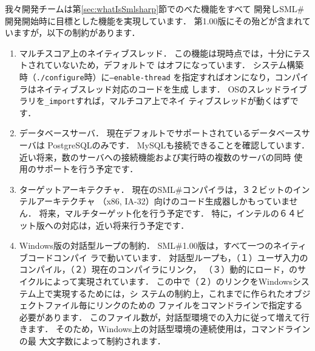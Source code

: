 \documentclass{jbook}
\newcommand{\smlsharp}{SML\#}
\newcommand{\version}{1.00}
\begin{document}
	我々開発チームは第\ref{sec:whatIsSmlsharp}節でのべた機能をすべて
開発し\smlsharp{}開発開始時に目標とした機能を実現しています．
	第\version{}版にその殆どが含まれていますが，以下の制約があります．
\begin{enumerate}
\item マルチスコア上のネイティブスレッド．
	この機能は現時点では，十分にテストされていないため，デフォルトで
はオフになっています．
	システム構築時（{\tt ./configure}時）に{\tt --enable-thread}
を指定すればオンになり，コンパイラはネイティブスレッド対応のコードを生成
します．
	OSのスレッドライブラリを{\tt \_import}すれば，マルチコア上でネイ
ティブスレッドが動くはずです．

\item データベースサーバ．
	現在デフォルトでサポートされているデータベースサーバは
PostgreSQLのみです．
	MySQLも接続できることを確認しています．
	近い将来，数のサーバへの接続機能および実行時の複数のサーバの同時
使用のサポートを行う予定です．

\item ターゲットアーキテクチャ．
	現在の\smlsharp{}コンパイラは，３２ビットのインテルアーキテクチャ
（x86, IA-32）向けのコード生成器しかもっていません．
	将来，マルチターゲット化を行う予定です．
	特に，インテルの６４ビット版への対応は，近い将来行う予定です．

\item Windows版の対話型ループの制約．
	\smlsharp{}\version{}版は，すべて一つのネイティブコードコンパイ
ラで動いています．
	対話型ループも，（１）ユーザ入力のコンパイル，（２）現在のコンパイラにリンク，
（３）動的にロード，のサイクルによって実現されています．
	この中で（２）のリンクをWindowsシステム上で実現するためには，シ
ステムの制約上，これまでに作られたオブジェクトファイル毎にリンクのための
ファイルをコマンドラインで指定する必要があります．
	このファイル数が，対話型環境での入力に従って増えて行きます．
	そのため，Windows上の対話型環境の連続使用は，コマンドラインの最
大文字数によって制約されます．
\end{enumerate}
\end{document}
